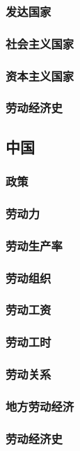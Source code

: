 \documentclass[UTF8]{../../RepresentationUniverse}
\begin{document}
        \subsubsection{发达国家}
        \subsubsection{社会主义国家}
        \subsubsection{资本主义国家}
        \subsubsection{劳动经济史}
    \subsection{中国}
        \subsubsection{政策}
        \subsubsection{劳动力}
        \subsubsection{劳动生产率}
        \subsubsection{劳动组织}
        \subsubsection{劳动工资}
        \subsubsection{劳动工时}
        \subsubsection{劳动关系}
        \subsubsection{地方劳动经济}
        \subsubsection{劳动经济史} 
\end{document}
